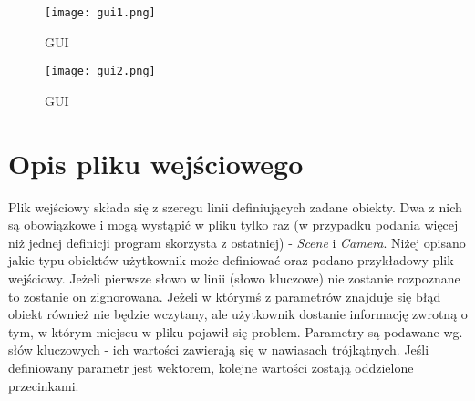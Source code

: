 \begin{figure}[htb!]
\centering
  \texttt{[image: gui1.png]}
  \caption{GUI}
\end{figure}

\begin{figure}[htb!]
\centering
  \texttt{[image: gui2.png]}
    \caption{GUI}
\end{figure}

\section{Opis pliku wejściowego}

Plik wejściowy składa się z szeregu linii definiujących zadane obiekty. Dwa z nich są obowiązkowe i mogą wystąpić w pliku tylko raz (w przypadku podania więcej niż jednej definicji program skorzysta z ostatniej) - \emph{Scene} i \emph{Camera}. Niżej opisano jakie typu obiektów użytkownik może definiować oraz podano przykładowy plik wejściowy. Jeżeli pierwsze słowo w linii (słowo kluczowe) nie zostanie rozpoznane to zostanie on zignorowana. Jeżeli w którymś z parametrów znajduje się błąd obiekt również nie będzie wczytany, ale użytkownik dostanie informację zwrotną o tym, w którym miejscu w pliku pojawił się problem. Parametry są podawane wg. słów kluczowych - ich wartości zawierają się w nawiasach trójkątnych. Jeśli definiowany parametr jest wektorem, kolejne wartości zostają oddzielone przecinkami.

